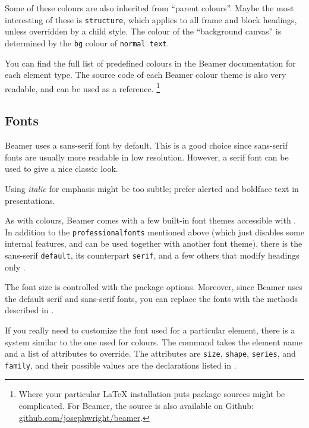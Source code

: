 Some of these colours are also inherited from ``parent colours''.
Maybe the most interesting of these is \verb|structure|,
which applies to all frame and block headings, unless overridden by a child style.
The colour of the ``background canvas'' is determined by the \verb|bg| colour of \verb|normal text|.

You can find the full list of predefined colours in the Beamer documentation for each element type.
The source code of each Beamer colour theme is also very readable,
and can be used as a reference.%
\footnote{Where your particular \LaTeX{} installation puts package sources might be complicated.
For Beamer, the source is also available on Github:
\url{github.com/josephwright/beamer}.}



\subsection{Fonts}

\begin{practices}
Beamer uses a sans-serif font by default.
This is a good choice since sans-serif fonts are usually more readable in low resolution.
However, a serif font can be used to give a nice classic look.

Using \emph{italic} for emphasis might be too subtle;
prefer alerted and boldface text in presentations.
\end{practices}

As with colours, Beamer comes with a few built-in font themes
accessible with .
In addition to the \verb|professionalfonts| mentioned above
(which just disables some internal features, and can be used together with another font theme),
there is the sans-serif \verb|default|, its counterpart \verb|serif|,
and a few others that modify headings only \cite[Section~18.1]{beamer}.

The font size is controlled with the package options.
Moreover, since Beamer uses the default serif and sans-serif fonts,
you can replace the fonts with the methods described in .

If you really need to customize the font used for a particular element,
there is a system similar to the one used for colours.
The  command takes the element name and a list of attributes to override.
The attributes are \verb|size|, \verb|shape|, \verb|series|, and \verb|family|,
and their possible values are the declarations listed in .

